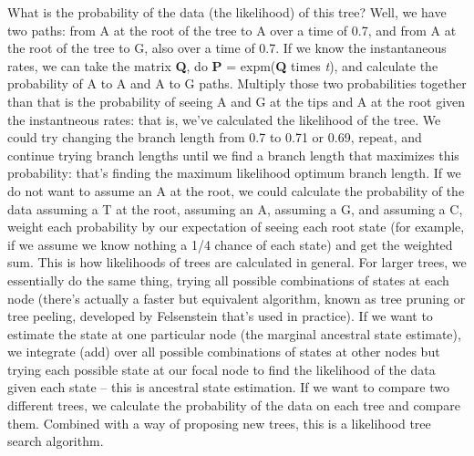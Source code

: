 \documentclass[]{article}
\begin{document}
What is the probability of the data (the likelihood) of this tree? Well, we have two paths: from A at the root of the tree to A over a time of 0.7, and from A at the root of the tree to G, also over a time of 0.7. If we know the instantaneous rates, we can take the matrix \textbf{Q}, do \textbf{P} = expm(\textbf{Q} times \emph{t}), and calculate the probability of A to A and A to G paths. Multiply those two probabilities together than that is the probability of seeing A and G at the tips and A at the root given the instantneous rates: that is, we've calculated the likelihood of the tree. We could try changing the branch length from 0.7 to 0.71 or 0.69, repeat, and continue trying branch lengths until we find a branch length that maximizes this probability: that's finding the maximum likelihood optimum branch length. If we do not want to assume an A at the root, we could calculate the probability of the data assuming a T at the root, assuming an A, assuming a G, and assuming a C, weight each probability by our expectation of seeing each root state (for example, if we assume we know nothing a 1/4 chance of each state) and get the weighted sum. This is how likelihoods of trees are calculated in general. For larger trees, we essentially do the same thing, trying all possible combinations of states at each node (there's actually a faster but equivalent algorithm, known as tree pruning or tree peeling, developed by Felsenstein that's used in practice). If we want to estimate the state at one particular node (the marginal ancestral state estimate), we integrate (add) over all possible combinations of states at other nodes but trying each possible state at our focal node to find the likelihood of the data given each state -- this is ancestral state estimation. If we want to compare two different trees, we calculate the probability of the data on each tree and compare them. Combined with a way of proposing new trees, this is a likelihood tree search algorithm.
\end{document}
